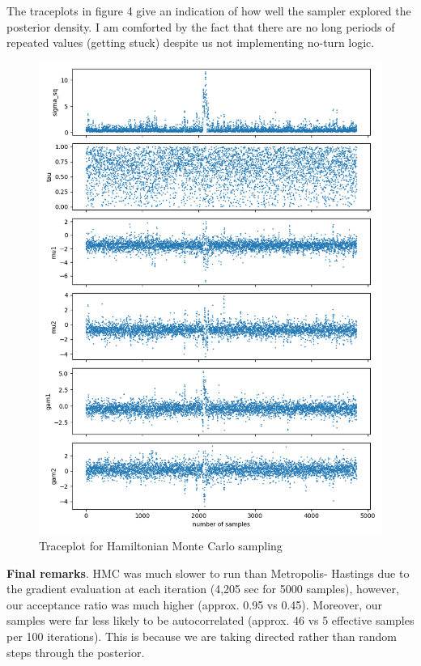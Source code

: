 \documentclass[12pt,letterpaper,twoside]{article}
\begin{document}
The traceplots in figure 4 give an indication of how well the sampler 
explored the posterior density. I am comforted by the fact that 
there are no long periods of repeated values (getting stuck) 
despite us not implementing no-turn logic. 
\begin{figure}[H]
    \centering
    \includegraphics[scale=0.7]{hmc_sampled_traceplot.png}
    \caption{Traceplot for Hamiltonian Monte Carlo sampling}
\end{figure}

\textbf{Final remarks}. HMC was much slower to run than Metropolis-
Hastings due to the gradient evaluation at each iteration (4,205 sec 
for 5000 samples), however, our acceptance ratio was much higher 
(approx. 0.95 vs 0.45). Moreover, our samples were far less likely 
to be autocorrelated (approx. 46 vs 5 effective samples per 100 
iterations). This is because we are taking directed rather than 
random steps through the posterior.
\end{document}
